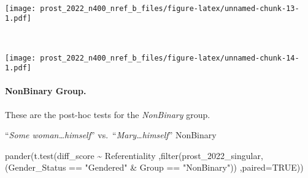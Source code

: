 \documentclass[
]{article}
\newenvironment{Shaded}{\begin{snugshade}}{\end{snugshade}}
\newcommand{\AttributeTok}[1]{\textcolor[rgb]{0.77,0.63,0.00}{#1}}
\newcommand{\ConstantTok}[1]{\textcolor[rgb]{0.00,0.00,0.00}{#1}}
\newcommand{\FunctionTok}[1]{\textcolor[rgb]{0.00,0.00,0.00}{#1}}
\newcommand{\NormalTok}[1]{#1}
\newcommand{\SpecialCharTok}[1]{\textcolor[rgb]{0.00,0.00,0.00}{#1}}
\newcommand{\StringTok}[1]{\textcolor[rgb]{0.31,0.60,0.02}{#1}}
\begin{document}
~

\texttt{[image: prost\_2022\_n400\_nref\_b\_files/figure-latex/unnamed-chunk-13-1.pdf]}

~

\texttt{[image: prost\_2022\_n400\_nref\_b\_files/figure-latex/unnamed-chunk-14-1.pdf]}

\hypertarget{nonbinary-group.}{%
\paragraph{NonBinary Group.}\label{nonbinary-group.}}

These are the post-hoc tests for the \emph{NonBinary} group.

``\emph{Some woman\ldots himself}'' vs.~``\emph{Mary\ldots himself}''
NonBinary

\begin{Shaded}
\begin{Highlighting}[]
\FunctionTok{pander}\NormalTok{(}\FunctionTok{t.test}\NormalTok{(diff\_score }\SpecialCharTok{\textasciitilde{}}\NormalTok{ Referentiality}
\NormalTok{       ,}\FunctionTok{filter}\NormalTok{(prost\_2022\_singular, (Gender\_Status }\SpecialCharTok{==} \StringTok{"Gendered"} \SpecialCharTok{\&}\NormalTok{ Group }\SpecialCharTok{==} \StringTok{"NonBinary"}\NormalTok{))}
\NormalTok{       ,}\AttributeTok{paired=}\ConstantTok{TRUE}\NormalTok{))}
\end{Highlighting}
\end{Shaded}
\end{document}
